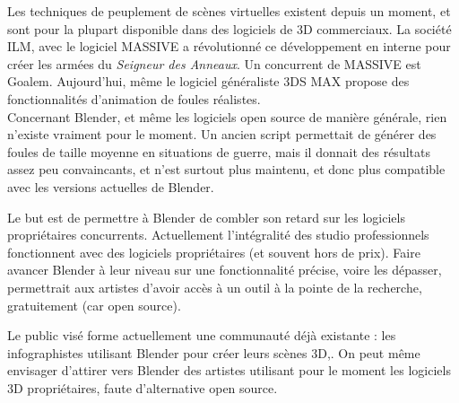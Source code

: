 \documentclass[a4paper,12pt]{article}
\begin{document}
Les techniques de peuplement de scènes virtuelles existent depuis un moment, et sont pour la plupart disponible dans des logiciels de 3D commerciaux. La société ILM, avec le logiciel MASSIVE\cite{Massive} a révolutionné ce développement en interne pour créer les armées du \textit{Seigneur des Anneaux}. Un concurrent de MASSIVE est Goalem\cite{Golaem}. Aujourd'hui, même le logiciel généraliste 3DS MAX\cite{3dsmax} propose des fonctionnalités d'animation de foules réalistes. \\
Concernant Blender, et même les logiciels open source de manière générale, rien n'existe vraiment pour le moment. Un ancien script permettait de générer des foules de taille moyenne en situations de guerre, mais il donnait des résultats assez peu convaincants, et n'est surtout plus maintenu, et donc plus compatible avec les versions actuelles de Blender.

Le but est de permettre à Blender de combler son retard sur les logiciels propriétaires concurrents. Actuellement l'intégralité des studio professionnels fonctionnent avec des logiciels propriétaires (et souvent hors de prix). Faire avancer Blender à leur niveau sur une fonctionnalité précise, voire les dépasser, permettrait aux artistes d'avoir accès à un outil à la pointe de la recherche, gratuitement (car open source).

Le public visé forme actuellement une communauté déjà existante : les infographistes utilisant Blender pour créer leurs scènes 3D,. On peut même envisager d'attirer vers Blender des artistes utilisant pour le moment les logiciels 3D propriétaires, faute d'alternative open source.
\end{document}
